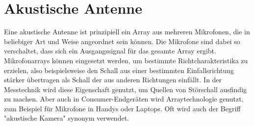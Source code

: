 \section{Akustische Antenne}
	Eine akustische Antenne ist prinzipiell ein Array aus mehreren Mikrofonen, die in beliebiger Art und Weise angeordnet sein können.
	Die Mikrofone sind dabei so verschaltet, dass sich ein Ausgangssignal für das gesamte Array ergibt.
	Mikrofonarrays können eingesetzt werden, um bestimmte Richtcharakteristika zu erzielen, also beispielsweise den Schall aus einer bestimmten Einfallsrichtung stärker übertragen als Schall der aus anderen Richtungen einfällt.
	In der Messtechnik wird diese Eigenschaft genutzt, um Quellen von Störschall ausfindig zu machen. %
	Aber auch in Consumer-Endgeräten wird Arraytechnologie genutzt, zum Beispiel für Mikrofone in Handys oder Laptops.
	Oft wird auch der Begriff "akustische Kamera" synonym verwendet.